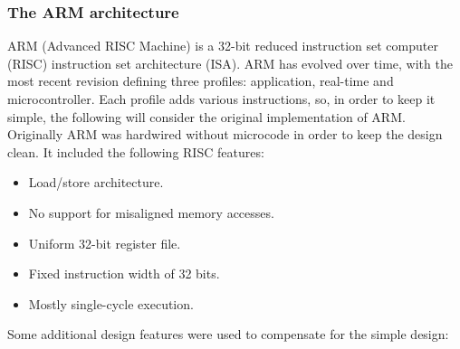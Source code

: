 \subsubsection{The ARM architecture}
ARM (Advanced RISC Machine) is a 32-bit reduced instruction set computer (RISC) instruction set architecture (ISA). ARM has evolved over time, with the most recent revision defining three profiles: application, real-time and microcontroller. Each profile adds various instructions, so, in order to keep it simple, the following will consider the original implementation of ARM. Originally ARM was hardwired without microcode in order to keep the design clean. It included the following RISC features:

\begin{itemize}
\item Load/store architecture.
\item No support for misaligned memory accesses.
\item Uniform 32-bit register file.
\item Fixed instruction width of 32 bits.
\item Mostly single-cycle execution.
\end{itemize}

Some additional design features were used to compensate for the simple design:


